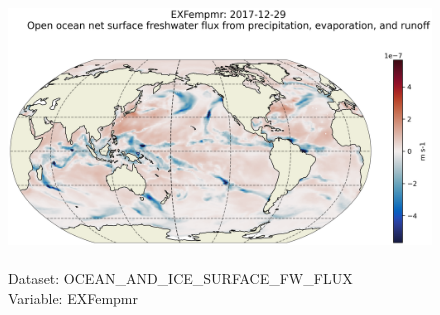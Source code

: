 \begin{figure}[H]
\centering
\includegraphics[scale=0.5]{../images/plots/latlon_plots/Ocean_and_Sea-Ice_Surface_Freshwater_Fluxes/EXFempmr.png}
\caption{\\Dataset: OCEAN\_AND\_ICE\_SURFACE\_FW\_FLUX\\Variable: EXFempmr}
\label{tab:table-OCEAN_AND_ICE_SURFACE_FW_FLUX_EXFempmr-Plot}
\end{figure}
\pagebreak
